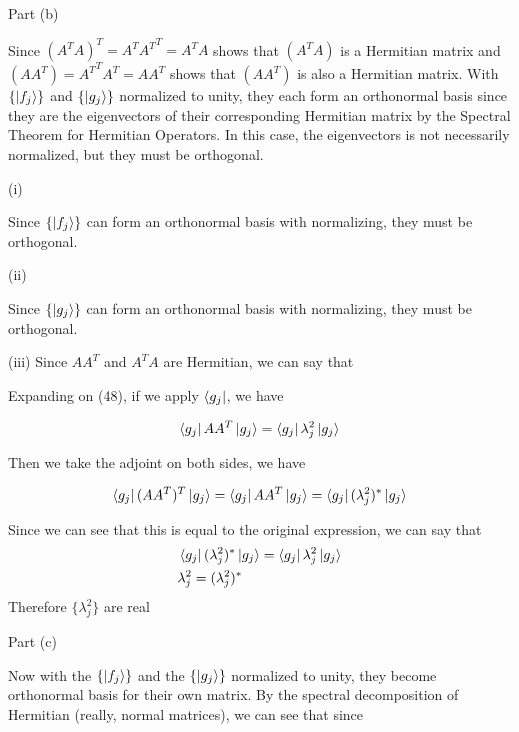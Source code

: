 \documentclass{article}
\begin{document}
Part (b)

Since $(A^TA)^T = A^T {A^T}^T = A^T A$ shows that $(A^TA)$ is a Hermitian matrix and $(AA^T) = {A^T}^T A^T = AA^T$ shows that $(AA^T)$ is also a Hermitian matrix. With $\{\ket{f_j}\}$ and $\{\ket{g_j}\}$ normalized to unity, they each form an orthonormal basis since they are the eigenvectors of their corresponding Hermitian matrix by the Spectral Theorem for Hermitian Operators. In this case, the eigenvectors is not necessarily normalized, but they must be orthogonal.

(i)

Since $\{\ket{f_j}\}$ can form an orthonormal basis with normalizing, they must be orthogonal.

(ii)

Since $\{\ket{g_j}\}$ can form an orthonormal basis with normalizing, they must be orthogonal.

(iii)
Since $AA^T$ and $A^TA$ are Hermitian, we can say that

Expanding on (48), if we apply $\bra{g_j}$, we have

\begin{align}
    \bra{g_j} AA^T \ket{g_j }= \bra{g_j} \lambda^2_j \ket{g_j}
\end{align}

Then we take the adjoint on both sides, we have 

\begin{align}
    \bra{g_j} (AA^T)^T \ket{g_j } = \bra{g_j} AA^T \ket{g_j } = \bra{g_j} (\lambda^2_j)^* \ket{g_j}
\end{align}

Since we can see that this is equal to the original expression, we can say that 
\begin{align}
    &\bra{g_j} (\lambda^2_j)^* \ket{g_j} = \bra{g_j} \lambda^2_j \ket{g_j} \\
    &\lambda^2_j = (\lambda^2_j)^*
\end{align}
Therefore $\{\lambda^2_j\}$ are real

Part (c)

Now with the $\{\ket{f_j}\}$ and the $\{\ket{g_j}\}$ normalized to unity, they become orthonormal basis for their own matrix. By the spectral decomposition of Hermitian (really, normal matrices), we can see that since
\end{document}
